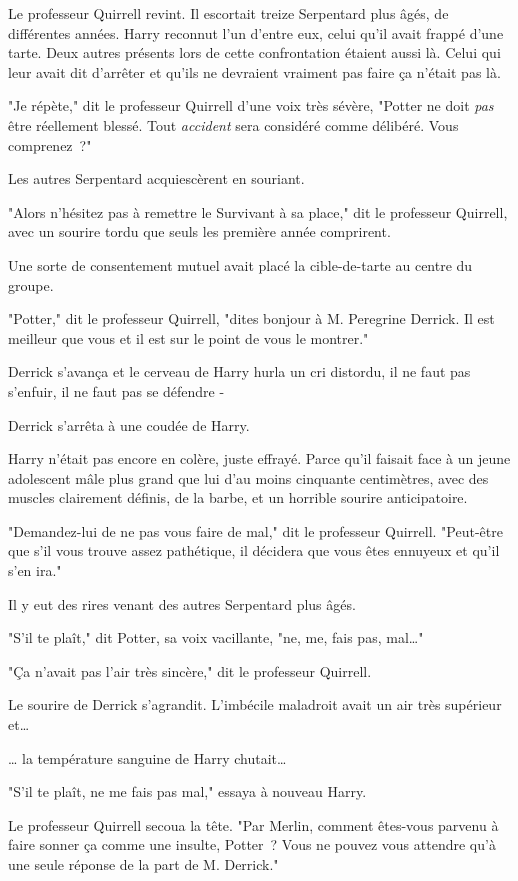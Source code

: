 Le professeur Quirrell revint. Il escortait treize Serpentard plus âgés, de différentes années. Harry reconnut l'un d'entre eux, celui qu'il avait frappé d'une tarte. Deux autres présents lors de cette confrontation étaient aussi là. Celui qui leur avait dit d'arrêter et qu'ils ne devraient vraiment pas faire ça n'était pas là.

"Je répète," dit le professeur Quirrell d'une voix très sévère, "Potter ne doit \emph{pas} être réellement blessé. Tout \emph{accident} sera considéré comme délibéré. Vous comprenez~?"

Les autres Serpentard acquiescèrent en souriant.

"Alors n'hésitez pas à remettre le Survivant à sa place," dit le professeur Quirrell, avec un sourire tordu que seuls les première année comprirent.

Une sorte de consentement mutuel avait placé la cible-de-tarte au centre du groupe.

"Potter," dit le professeur Quirrell, "dites bonjour à M. Peregrine Derrick. Il est meilleur que vous et il est sur le point de vous le montrer."

Derrick s'avança et le cerveau de Harry hurla un cri distordu, il ne faut pas s'enfuir, il ne faut pas se défendre -

Derrick s'arrêta à une coudée de Harry.

Harry n'était pas encore en colère, juste effrayé. Parce qu'il faisait face à un jeune adolescent mâle plus grand que lui d'au moins cinquante centimètres, avec des muscles clairement définis, de la barbe, et un horrible sourire anticipatoire.

"Demandez-lui de ne pas vous faire de mal," dit le professeur Quirrell. "Peut-être que s'il vous trouve assez pathétique, il décidera que vous êtes ennuyeux et qu'il s'en ira."

Il y eut des rires venant des autres Serpentard plus âgés.

"S'il te plaît," dit Potter, sa voix vacillante, "ne, me, fais pas, mal…"

"Ça n'avait pas l'air très sincère," dit le professeur Quirrell.

Le sourire de Derrick s'agrandit. L'imbécile maladroit avait un air très supérieur et…

… la température sanguine de Harry chutait…

"S'il te plaît, ne me fais pas mal," essaya à nouveau Harry.

Le professeur Quirrell secoua la tête. "Par Merlin, comment êtes-vous parvenu à faire sonner ça comme une insulte, Potter~? Vous ne pouvez vous attendre qu'à une seule réponse de la part de M. Derrick."

